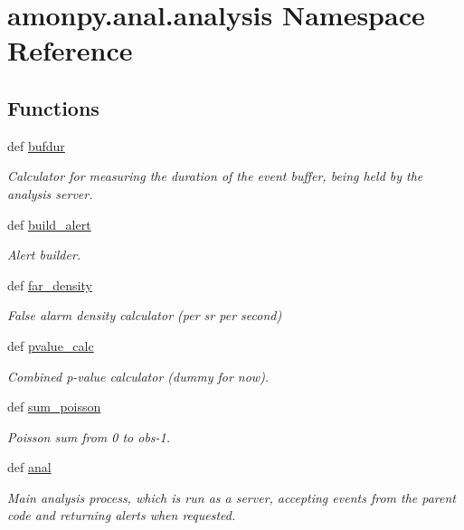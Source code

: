 \hypertarget{namespaceamonpy_1_1anal_1_1analysis}{\section{amonpy.\-anal.\-analysis Namespace Reference}
\label{namespaceamonpy_1_1anal_1_1analysis}
}
\subsection*{Functions}
\begin{DoxyCompactItemize}
\item 
def \hyperlink{namespaceamonpy_1_1anal_1_1analysis_aed5b550ff7cbb888d019157b065e2055}{bufdur}
\begin{DoxyCompactList}\small\item\em Calculator for measuring the duration of the event buffer, being held by the analysis server. \end{DoxyCompactList}\item 
def \hyperlink{namespaceamonpy_1_1anal_1_1analysis_ac3eb2116d918592df6e34c1519604e35}{build\-\_\-alert}
\begin{DoxyCompactList}\small\item\em Alert builder. \end{DoxyCompactList}\item 
def \hyperlink{namespaceamonpy_1_1anal_1_1analysis_a8953e77d01e9caa5ca5e8e98307e400a}{far\-\_\-density}
\begin{DoxyCompactList}\small\item\em False alarm density calculator (per sr per second) \end{DoxyCompactList}\item 
def \hyperlink{namespaceamonpy_1_1anal_1_1analysis_a8fc861e2886ffe84d31493cd2acc42a9}{pvalue\-\_\-calc}
\begin{DoxyCompactList}\small\item\em Combined p-\/value calculator (dummy for now). \end{DoxyCompactList}\item 
def \hyperlink{namespaceamonpy_1_1anal_1_1analysis_a0c73147a4fe2f1a9d854d225e4d6a8f4}{sum\-\_\-poisson}
\begin{DoxyCompactList}\small\item\em Poisson sum from 0 to obs-\/1. \end{DoxyCompactList}\item 
def \hyperlink{namespaceamonpy_1_1anal_1_1analysis_ac5ddeedffb329f60b3860addbba83776}{anal}
\begin{DoxyCompactList}\small\item\em Main analysis process, which is run as a server, accepting events from the parent code and returning alerts when requested. \end{DoxyCompactList}\end{DoxyCompactItemize}



